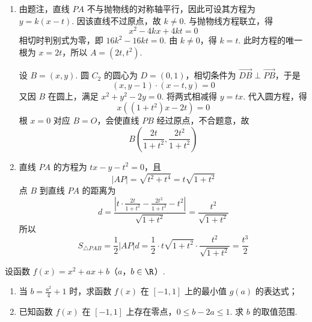 \begin{solution}
\begin{enumerate}
\item 由题注，直线 \(PA\) 不与抛物线的对称轴平行，因此可设其方程为 \(y=k(x-t)\). 因该直线不过原点，故 \(k\neq0\). 与抛物线方程联立，得
\[
x^2-4kx+4kt=0
\]
相切时判别式为零，即 \(16k^2-16kt=0\). 由 \(k\neq0\)，得 \(k=t\). 此时方程的唯一根为 \(x=2t\)，所以 \(A=(2t,t^2)\).

设 \(B=(x,y)\). 圆 \(C_2\) 的圆心为 \(D=(0,1)\)，相切条件为 \(\overrightarrow{DB}\perp\overrightarrow{PB}\)，于是
\[
(x,y-1)\cdot(x-t,y)=0
\]
又因 \(B\) 在圆上，满足 \(x^2+y^2-2y=0\). 将两式相减得 \(y=tx\). 代入圆方程，得
\[
x\left((1+t^2)x-2t\right)=0
\]
根 \(x=0\) 对应 \(B=O\)，会使直线 \(PB\) 经过原点，不合题意，故
\[
B\left(\frac{2t}{1+t^2},\frac{2t^2}{1+t^2}\right)
\]

\item 直线 \(PA\) 的方程为 \(tx-y-t^2=0\)，且
\[
|AP|=\sqrt{t^2+t^4}=t\sqrt{1+t^2}
\]
点 \(B\) 到直线 \(PA\) 的距离为
\[
d=\frac{|t\cdot\frac{2t}{1+t^2}-\frac{2t^2}{1+t^2}-t^2|}{\sqrt{1+t^2}}=\frac{t^2}{\sqrt{1+t^2}}
\]
所以
\[
S_{\triangle PAB}=\frac12|AP|d=\frac12\cdot t\sqrt{1+t^2}\cdot\frac{t^2}{\sqrt{1+t^2}}=\frac{t^3}{2}
\]
\end{enumerate}
\end{solution}

\begin{problem}
设函数 \(f(x)=x^2+ax+b\)（\(a\)，\(b\in\R\)）.

\begin{enumerate}
\item 当 \(b=\frac{a^2}{4}+1\) 时，求函数 \(f(x)\) 在 \([-1,1]\) 上的最小值 \(g(a)\) 的表达式；
\item 已知函数 \(f(x)\) 在 \([-1,1]\) 上存在零点，\(0\leqslant b-2a\leqslant 1\). 求 \(b\) 的取值范围.
\end{enumerate}
\end{problem}

